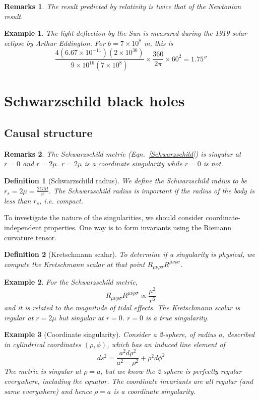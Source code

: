 \documentclass[a4paper]{article}
\newtheorem{eg}{Example}[section]
\newtheorem{remarks}{Remarks}[section]
\theoremstyle{new}
\newtheorem{defi}{Definition}[section]
\begin{document}
\begin{remarks}
The result predicted by relativity is twice that of the Newtonian result.
\end{remarks}
\begin{eg}
The light deflection by the Sun is measured during the 1919 solar eclipse by Arthur Eddington. For $b=7\times10^8$ m, this is
$$\frac{4(6.67\times10^{-11})(2\times10^{30})}{9\times10^{16}(7\times10^8)}\times\frac{360}{2\pi}\times 60^2=1.75''$$
\end{eg}
\newpage
\section{Schwarzschild black holes}
\subsection{Causal structure}
\begin{remarks}
The Schwarzschild metric (Eqn.~\ref{Schwarzschild}) is singular at $r=0$ and $r=2\mu$. $r=2\mu$ is a coordinate singularity while $r=0$ is not. 
\end{remarks}
\begin{defi}[Schwarzschild radius]
We define the Schwarzschild radius to be $r_s=2\mu=\frac{2GM}{c^2}$. The Schwarzschild radius is important if the radius of the body is less than $r_s$, i.e. compact.
\end{defi}
To investigate the nature of the singularities, we should consider coordinate-independent properties. One way is to form invariants using the Riemann curvature tensor.
\begin{defi}[Kretschmann scalar]
To determine if a singularity is physical, we compute the Kretschmann scalar at that point $R_{\mu\nu\rho\sigma}R^{\mu\nu\rho\sigma}$.  
\end{defi}
\begin{eg}
For the Schwarzschild metric, \begin{equation}
R_{\mu\nu\rho\sigma}R^{\mu\nu\rho\sigma}\propto\frac{\mu^2}{r^6}\label{Kretschmann}
\end{equation}
and it is related to the magnitude of tidal effects. The Kretschmann scalar is regular at $r=2\mu$ but singular at $r=0$. $r=0$ is a true singularity.
\end{eg}
\begin{eg}[Coordinate singularity]
Consider a 2-sphere, of radius $a$, described in cylindrical coordinates $(\rho,\phi)$, which has an induced line element of 
$$ds^2=\frac{a^2d\rho^2}{a^2-\rho^2}+\rho^2d\phi^2$$
The metric is singular at $\rho=a$, but we know the 2-sphere is perfectly regular everywhere, including the equator. The coordinate invariants are all regular (and same everywhere) and hence $\rho=a$ is a coordinate singularity.
\end{eg}
\end{document}

